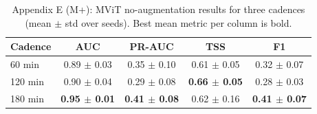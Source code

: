 \begin{table}[p]
\centering
\scriptsize
\caption{Appendix E (M+): MViT no-augmentation results for three cadences (mean $\pm$ std over seeds). Best mean metric per column is bold.}
\label{tab:appE_mvit_mplus}
\begin{tabular}{lcccc}
\toprule
Cadence & AUC & PR-AUC & TSS & F1 \\
\midrule
60 min & 0.89 $\pm$ 0.03 & 0.35 $\pm$ 0.10 & 0.61 $\pm$ 0.05 & 0.32 $\pm$ 0.07 \\
120 min & 0.90 $\pm$ 0.04 & 0.29 $\pm$ 0.08 & \textbf{0.66 $\pm$ 0.05} & 0.28 $\pm$ 0.03 \\
180 min & \textbf{0.95 $\pm$ 0.01} & \textbf{0.41 $\pm$ 0.08} & 0.62 $\pm$ 0.16 & \textbf{0.41 $\pm$ 0.07} \\
\bottomrule
\end{tabular}
\end{table}
